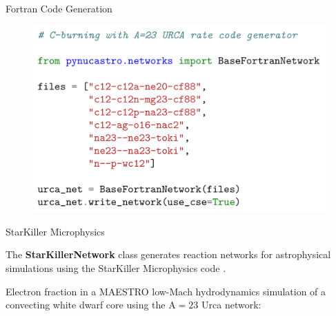 \documentclass[final]{beamer}
\newlength{\onecolwid}
\newlength{\twocolwid}
\newcommand{\isot}[2]{$^{#2}\mathrm{#1}$}
\begin{document}
\begin{frame}[t]
\begin{columns}[t]
\begin{column}{\twocolwid}
\begin{columns}[t,totalwidth=\twocolwid]
\begin{column}{\onecolwid}
\begin{block}{Fortran Code Generation}
\begin{figure}
\includegraphics[width=0.8\linewidth]{figures/basefortran-network/basefortrannetwork.png}
\end{figure}

\end{block}


\begin{block}{StarKiller Microphysics}

The \textbf{StarKillerNetwork} class generates reaction
networks for astrophysical simulations using the StarKiller
Microphysics code \cite{Zingale.astronum.2017}.
\newline

Electron fraction in a MAESTRO low-Mach hydrodynamics simulation of a
convecting white dwarf core using the $\mathrm{A=23}$ Urca network:


\end{block}
\end{column}
\end{columns}
\end{column}
\end{columns}
\end{frame}
\end{document}

